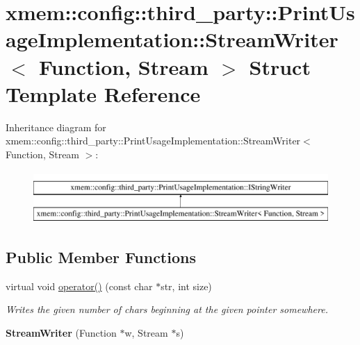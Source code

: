 \hypertarget{structxmem_1_1config_1_1third__party_1_1_print_usage_implementation_1_1_stream_writer}{}\section{xmem\+:\+:config\+:\+:third\+\_\+party\+:\+:Print\+Usage\+Implementation\+:\+:Stream\+Writer$<$ Function, Stream $>$ Struct Template Reference}
\label{structxmem_1_1config_1_1third__party_1_1_print_usage_implementation_1_1_stream_writer}
Inheritance diagram for xmem\+:\+:config\+:\+:third\+\_\+party\+:\+:Print\+Usage\+Implementation\+:\+:Stream\+Writer$<$ Function, Stream $>$\+:\begin{figure}[H]
\begin{center}
\leavevmode
\includegraphics[height=2.000000cm]{structxmem_1_1config_1_1third__party_1_1_print_usage_implementation_1_1_stream_writer}
\end{center}
\end{figure}
\subsection*{Public Member Functions}
\begin{DoxyCompactItemize}
\item 
\hypertarget{structxmem_1_1config_1_1third__party_1_1_print_usage_implementation_1_1_stream_writer_aa5deaf2391cf05fc97ded29011eb345c}{}virtual void \hyperlink{structxmem_1_1config_1_1third__party_1_1_print_usage_implementation_1_1_stream_writer_aa5deaf2391cf05fc97ded29011eb345c}{operator()} (const char $\ast$str, int size)\label{structxmem_1_1config_1_1third__party_1_1_print_usage_implementation_1_1_stream_writer_aa5deaf2391cf05fc97ded29011eb345c}

\begin{DoxyCompactList}\small\item\em Writes the given number of chars beginning at the given pointer somewhere. \end{DoxyCompactList}\item 
\hypertarget{structxmem_1_1config_1_1third__party_1_1_print_usage_implementation_1_1_stream_writer_ab09e3fe226950f1d06c8e8e0b15ad32c}{}{\bfseries Stream\+Writer} (Function $\ast$w, Stream $\ast$s)\label{structxmem_1_1config_1_1third__party_1_1_print_usage_implementation_1_1_stream_writer_ab09e3fe226950f1d06c8e8e0b15ad32c}

\end{DoxyCompactItemize}
